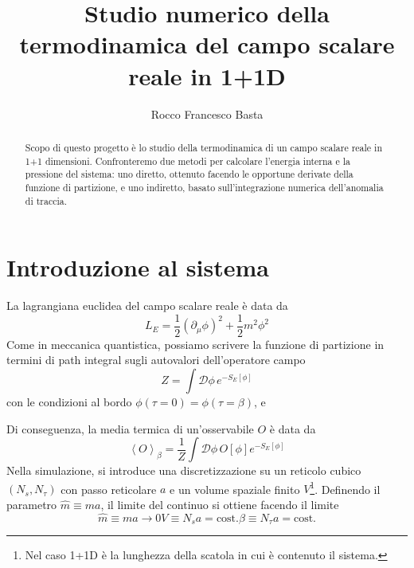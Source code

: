 \documentclass[a4paper,11pt]{article}
\title{Studio numerico della termodinamica del campo scalare reale in 1+1D}
\author{Rocco Francesco Basta}
\date{}
\newcommand{\avg}[1]{\left\langle {#1} \right\rangle}
\begin{document}
\maketitle

\begin{abstract}
    Scopo di questo progetto è lo studio della termodinamica di un campo scalare reale in 1+1 dimensioni. Confronteremo due metodi per calcolare l'energia interna e la pressione del sistema: uno diretto, ottenuto facendo le opportune derivate della funzione di partizione, e uno indiretto, basato sull'integrazione numerica dell'anomalia di traccia.
\end{abstract}

\section{Introduzione al sistema}
    La lagrangiana euclidea del campo scalare reale è data da
    \begin{equation}
        L_E = \frac{1}{2} (\partial_\mu \phi )^2 + \frac{1}{2}m^2 \phi^2 
    \end{equation}
    Come in meccanica quantistica, possiamo scrivere la funzione di partizione in termini di path integral sugli autovalori dell'operatore campo
    \begin{equation}
        Z = \int \mathcal{D}\phi \, e^{-S_E[\phi]}
        \label{eqn:z-path-integral}
    \end{equation}
    con le condizioni al bordo $\phi(\tau = 0) = \phi(\tau = \beta)$, e
    
    Di conseguenza, la media termica di un'osservabile $O$ è data da
    \begin{equation}
        \avg{O}_\beta = \frac{1}{Z} \int \mathcal{D} \phi \, O[\phi] e^{-S_E[\phi]}
    \end{equation}
    Nella simulazione, si introduce una discretizzazione su un reticolo cubico $(N_s, N_\tau)$ con passo reticolare $a$ e un volume spaziale finito $V$\footnote{Nel caso 1+1D è la lunghezza della scatola in cui è contenuto il sistema.}. Definendo il parametro $\hat{m} \equiv ma$, il limite del continuo si ottiene facendo il limite
    \begin{subequations}
        \begin{equation}
            \hat{m} \equiv ma \to 0
        \end{equation}
        \begin{equation}
            V \equiv N_s a = \text{cost.}
        \end{equation}
        \begin{equation}
            \beta \equiv N_\tau a = \text{cost.}
        \end{equation}
    \end{subequations}
    
\end{document}
